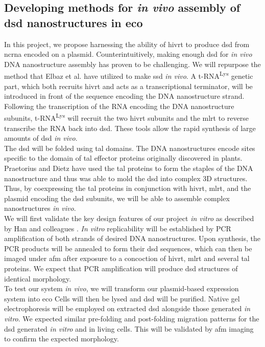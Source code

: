 \documentclass[a4paper]{article}
\begin{document}
\subsection*{Developing methods for \textit{in vivo} assembly of \ac{dsd} nanostructures in \ac{eco}}
In this project, we propose harnessing the ability of \ac{hivrt} to produce \ac{dsd} from \ac{ncrna} encoded on a plasmid.
Counterintuitively, making enough \ac{dsd} for \textit{in vivo} DNA nanostructure assembly has proven to be challenging.
We will repurpose the method that Elbaz et al. have utilized to make \ac{ssd} \textit{in vivo}\cite{meth1}.
A t-RNA\textsuperscript{Lys} genetic part, which both recruits \ac{hivrt} and acts as a transcriptional terminator, will be introduced in front of the sequence encoding the DNA nanostructure strand.
Following the transcription of the RNA encoding the DNA nanostructure subunits, t-RNA\textsuperscript{Lys} will recruit the two \ac{hivrt} subunits and the \ac{mlrt} to reverse transcribe the RNA back into \ac{dsd}.
These tools allow the rapid synthesis of large amounts of \ac{dsd} \textit{in vivo}.
\vspace{2 mm}
\\
The \ac{dsd} will be folded using \ac{tal} domains.
The DNA nanostructures encode sites specific to the domain of \ac{tal} effector proteins originally discovered in plants.
Praetorius and Dietz have used the \ac{tal} proteins to form the staples of the DNA nanostructure and thus was able to mold the \ac{dsd} into complex 3D structures\cite{meth2}.
Thus, by coexpressing the \ac{tal} proteins in conjunction with \ac{hivrt}, \ac{mlrt}, and the plasmid encoding the \ac{dsd} subunits, we will be able to assemble complex nanostructures \textit{in vivo}.
\vspace{2 mm}
\\
We will first validate the key design features of our project \textit{in vitro} as described by Han and colleagues \cite{meth3}.
\textit{In vitro} replicability will be established by PCR amplification of both strands of desired DNA nanostructures.
Upon synthesis, the PCR products will be annealed to form their \ac{dsd} sequences, which can then be imaged under \ac{afm} after exposure to a concoction of \ac{hivrt}, \ac{mlrt} and several \ac{tal} proteins.
We expect that PCR amplification will produce \ac{dsd} structures of identical morphology.
\vspace{2 mm}
\\
To test our system \textit{in vivo}, we will transform our plasmid-based expression system into \ac{eco}
Cells will then be lysed and \ac{dsd} will be purified.
Native gel electrophoresis will be employed on extracted \ac{dsd} alongside those generated \textit{in vitro}.
We expected similar pre-folding and post-folding migration patterns for the \ac{dsd} generated \textit{in vitro} and in living cells.
This will be validated by \ac{afm} imaging to confirm the expected morphology.
\end{document}

